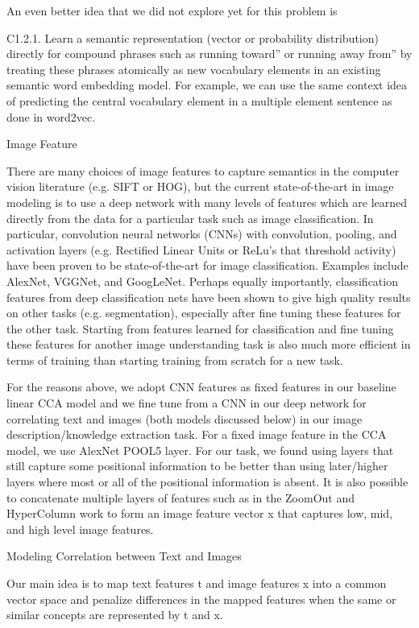 \documentclass[runningheads]{llncs}
\begin{document}
An even better idea that we did not explore yet for this problem is

C1.2.1. Learn a semantic representation (vector or probability distribution) directly for compound phrases such as running toward” or running away from” by treating these phrases atomically as new vocabulary elements in an existing semantic word embedding model. For example, we can use the same context idea of predicting the central vocabulary element in a multiple element sentence as done in word2vec.

Image Feature

There are many choices of image features to capture semantics in the computer vision literature (e.g. SIFT or HOG), but the current state-of-the-art in image modeling is to use a deep network with many levels of features which are learned directly from the data for a particular task such as image classification. In particular, convolution neural networks (CNNs) with convolution, pooling, and activation layers (e.g. Rectified Linear Units or ReLu’s that threshold activity) have been proven to be state-of-the-art for image classification. Examples include AlexNet, VGGNet, and GoogLeNet. Perhaps equally importantly, classification features from deep classification nets have been shown to give high quality results on other tasks (e.g. segmentation), especially after fine tuning these features for the other task. Starting from features learned for classification and fine tuning these features for another image understanding task is also much more efficient in terms of training than starting training from scratch for a new task.

For the reasons above, we adopt CNN features as fixed features in our baseline linear CCA model and we fine tune from a CNN in our deep network for correlating text and images (both models discussed below) in our image description/knowledge extraction task. For a fixed image feature in the CCA model, we use AlexNet POOL5 layer. For our task, we found using layers that still capture some positional information to be better than using later/higher layers where most or all of the positional information is absent. It is also possible to concatenate multiple layers of features such as in the ZoomOut and HyperColumn work to form an image feature vector x that captures low, mid, and high level image features.

Modeling Correlation between Text and Images

Our main idea is to map text features t and image features x into a common vector space and penalize differences in the mapped features when the same or similar concepts are represented by t and x.
\end{document}
